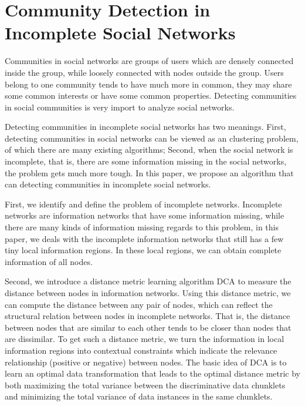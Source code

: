 \chapter{Community Detection in Incomplete Social Networks}
\label{chap:longabstract}

Communities in social networks are groups of users which are densely
connected inside the group, while loosely connected with nodes outside the group.
Users belong to one community tends to have much more in common, 
they may share some common interests or have some common properties.
Detecting communities in social communities is very import to analyze
social networks.

Detecting communities in incomplete social networks has two meanings.
First, detecting communities in social networks can be viewed as an clustering problem,
of which there are many existing algorithms; 
Second, when the social network is incomplete, that is, there are some information missing
in the social networks, the problem gets much more tough.
In this paper, we propose an algorithm that can detecting communities in incomplete social networks.

First, we identify and define the problem of incomplete networks.
Incomplete networks are information networks that have some information missing,
while there are many kinds of information missing regards to this problem,
in this paper, we deals with the incomplete information networks that still
has a few tiny local information regions. In these local regions, we can obtain
complete information of all nodes.

Second, we introduce a distance metric learning algorithm DCA to measure the 
distance between nodes in information networks. Using this distance metric,
we can compute the distance between any pair of nodes, which can reflect the
structural relation between nodes in incomplete networks. That is,
the distance between nodes that are similar to each other tends to be closer
than nodes that are dissimilar. To get such a distance metric, 
we turn the information in local information regions into 
contextual constraints which indicate the relevance relationship (positive or negative)
between nodes. The basic idea of DCA is to learn an
optimal data transformation that leads to the optimal distance 
metric by both maximizing the total variance between
the discriminative data chunklets and minimizing the total
variance of data instances in the same chunklets.

